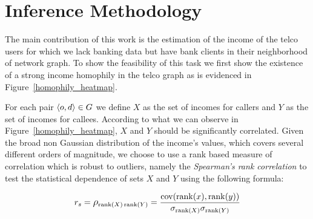 \section{Inference Methodology}






The main contribution of this work is the estimation of the income of the telco users for which we lack banking data but have bank clients in their neighborhood of network graph. To show the feasibility of this task we first show the existence of a strong income homophily in the telco graph as is evidenced in Figure~\ref{homophily_heatmap}.

For each pair \( \left< o, d \right> \in \mathlarger{G} \) we define \( X \) as the set of incomes for callers and \( Y \) as the set of incomes for callees. According to what we can observe in Figure~\ref{homophily_heatmap}, \( X \) and \( Y \) should be significantly correlated. Given the broad non Gaussian distribution of the income's values, which covers several different  orders of magnitude, we choose to use a rank based measure of correlation which is robust to outliers, namely the \textit{Spearman's rank correlation} %
to test the statistical dependence of sets \( X \) and \( Y \) using the following formula:

\begin{equation}
r_s = \mathlarger{\rho}_{\operatorname{rank}(X) \operatorname{rank}(Y)} = \frac{\operatorname{cov}(\operatorname{rank}(x), \operatorname{rank}(y))}{\sigma_{\operatorname{rank}(X)} \sigma_{\operatorname{rank}(Y)}}
\label{spearman}
\end{equation}

